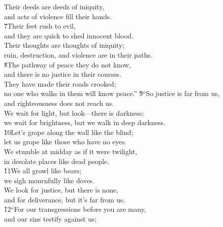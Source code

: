 \begin{poetry}
\poeml Their deeds are deeds of iniquity, \\
\poemll    and acts of violence fill their hands. \\
\poeml \v{7}Their feet rush to evil, \\
\poemll    and they are quick to shed innocent blood. \\
\poeml Their thoughts are thoughts of iniquity; \\
\poemll    ruin, destruction, and violence are in their paths. \\
\poeml \v{8}The pathway of peace they do not know, \\
\poemll    and there is no justice in their courses. \\
\poeml They have made their roads crooked; \\
\poemll    no one who walks in them will know peace.''
\poeml \v{9}``So justice is far from us, \\
\poemll    and righteousness does not reach us. \\
\poeml We wait for light, but look---there is darkness; \\
\poemll    we wait for brightness, but we walk in deep darkness. \\
\poeml \v{10}Let's grope along the wall like the blind; \\
\poemll    let us grope like those who have no eyes. \\
\poeml We stumble at midday as if it were twilight, \\
\poemll    in desolate places like dead people. \\
\poeml \v{11}We all growl like bears; \\
\poemll    we sigh mournfully like doves. \\
\poeml We look for justice, but there is none, \\
\poemll    and for deliverance, but it's far from us. \\
\poeml \v{12}``For our transgressions before you are many, \\
\poemll    and our sins testify against us; \\

\end{poetry}
